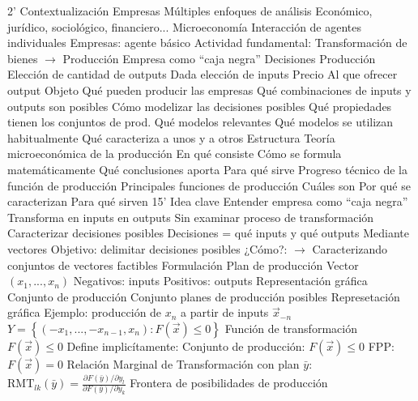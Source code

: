 \documentclass{nuevotema}
\begin{document}
\begin{esquemal}
	\1[]  2'
		\2 Contextualización
			\3 Empresas
				\4 Múltiples enfoques de análisis
				\4 Económico, jurídico, sociológico, financiero...
			\3 Microeconomía
				\4 Interacción de agentes individuales
				\4 Empresas: agente básico
				\4 Actividad fundamental:
				\4[] Transformación de bienes $\to$ Producción
				\4 Empresa como ``caja negra''
			\3 Decisiones
				\4 Producción
				\4[$\to$] Elección de cantidad de outputs
				\4[$\to$] Dada elección de inputs
				\4 Precio
				\4[$\to$] Al que ofrecer output
		\2 Objeto
			\3 Qué pueden producir las empresas
				\4[$\to$] Qué combinaciones de inputs y outputs son posibles
			\3 Cómo modelizar las decisiones posibles
				\4[$\to$] Qué propiedades tienen los conjuntos de prod.
			\3 Qué modelos relevantes
				\4[$\to$] Qué modelos se utilizan habitualmente
				\4[$\to$] Qué caracteriza a unos y a otros
		\2 Estructura
			\3 Teoría microeconómica de la producción
				\4 En qué consiste
				\4 Cómo se formula matemáticamente
				\4 Qué conclusiones aporta
				\4 Para qué sirve
			\3 Progreso técnico de la función de producción
			\3 Principales funciones de producción
				\4 Cuáles son
				\4 Por qué se caracterizan
				\4 Para qué sirven
	\1  15'
		\2 Idea clave
			\3 Entender empresa como ``caja negra''
				\4 Transforma en inputs en outputs
				\4 Sin examinar proceso de transformación
			\3 Caracterizar decisiones posibles
				\4 Decisiones = qué inputs y qué outputs
				\4 Mediante vectores
				\4 Objetivo:
				\4[$\to$] delimitar decisiones posibles
				\4 ¿Cómo?:
				\4[] $\to$ Caracterizando conjuntos de vectores factibles
		\2 Formulación
			\3 Plan de producción
				\4 Vector $(x_1, ..., x_n)$
				\4 Negativos: inputs
				\4 Positivos: outputs
				\4 Representación gráfica
				\4[] 
			\3 Conjunto de producción
				\4 Conjunto planes de producción posibles
				\4 Represetación gráfica
				\4[] 
				\4 Ejemplo: producción de $x_n$ a partir de inputs $\vec{x}_{-n}$
				\4[] $Y = \left\lbrace \left( -x_1, ..., -x_{n-1}, x_n \right): F(\vec{x}) \leq 0 \right\rbrace $
			\3 {Función de transformación}
				\4 $F(\vec{x}) \leq 0$
				\4 Define implicítamente:
				\4[] Conjunto de producción: $F(\vec{x}) \leq 0$
				\4[] FPP: $F(\vec{x}) = 0$
				\4 Relación Marginal de Transformación con plan $\bar{y}$:
				\4[] $\text{RMT}_{lk}(\bar{y}) = \frac{\partial F(\bar{y})/ \partial y_l}{\partial F(\bar{y}) / \partial y_k}$
			\3 {Frontera de posibilidades de producción}

\end{esquemal}
\end{document}
